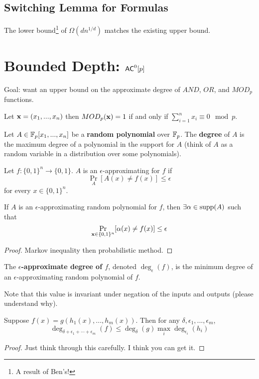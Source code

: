 \documentclass[11pt]{article}
\begin{document}
	\subsection{Switching Lemma for Formulas}
	The lower bound\footnote{A result of Ben's!} of $\Omega(dn^{1/d})$ matches the existing upper bound. 
	
\section{Bounded Depth: \texorpdfstring{$\mathsf{AC}^0[p]$}{AC0[p]}}
	Goal: want an upper bound on the approximate degree of $AND$, $OR$, and $MOD_p$ functions.
	\begin{definition}
		Let $\mathbf{x} = (x_1,..., x_n)$ then $MOD_p(\mathbf{x}) = 1$ if and only if $\sum_{i = 1}^{n} x_i \equiv 0 \mod p$. 
	
		Let $A \in \mathbb{F}_p[x_1, ..., x_n]$ be a \textbf{random polynomial} over $\mathbb{F}_p$. The \textbf{degree} of $A$ is the maximum degree of a polynomial in the support for $A$ (think of $A$ as a random variable in a distribution over some polynomials). 
		
		Let $f: \{0,1\}^n \rightarrow \{0,1\}$. $A$ is an $\epsilon$-approximating for $f$ if
		\[\Pr_A[A(x) \neq f(x)] \leq \epsilon \]
		for every $x \in \{0,1\}^n$. 
	\end{definition}
	
	\begin{lemma}
		If $A$ is an $\epsilon$-approximating random polynomial for $f$, then $\exists \alpha \in \operatorname*{supp}(A)$ such that
		\[\Pr_{\mathbf{x} \in \{0,1\}^{n}}[\alpha(x) \neq f(x)] \leq \epsilon\]
	\end{lemma}
	\begin{proof}
		Markov inequality then probabilistic method. 
	\end{proof}
	
	\begin{definition}
		The \textbf{$\epsilon$-approximate degree of $f$}, denoted $\deg_{\epsilon}(f)$, is the minimum degree of an $\epsilon$-approximating random polynomial of $f$. 
		
		Note that this value is invariant under negation of the inputs and outputs (please understand why).
	\end{definition}
		
	\begin{lemma}
		\label{lem:epsapproxdegofcompfunction}
		Suppose $f(x) = g(h_1(x), ..., h_m(x))$. Then for any $\delta, \epsilon_1, ..., \epsilon_m$, 
		\[\deg_{\delta + \epsilon_1 + \cdots + \epsilon_m}(f) \leq \deg_{\delta}(g)\max_{i}\deg_{\epsilon_i}(h_i)\]
	\end{lemma}
	\begin{proof}
		Just think through this carefully. I think you can get it.
	\end{proof}
	
\end{document}
